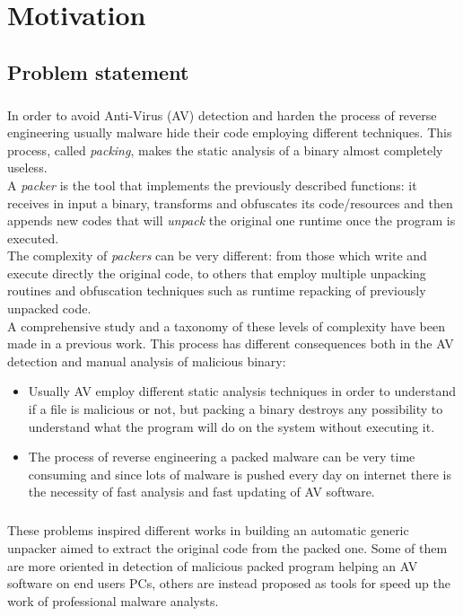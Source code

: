 \chapter{Motivation}
\label{chapter2}
\thispagestyle{empty}

\section{Problem statement}
\paragraph{}
In order to avoid Anti-Virus (AV) detection and harden the process of reverse engineering usually malware hide their code employing different techniques. This process, called \textit{packing}, makes the static analysis of a binary almost completely useless.\\
A \textit{packer} is the tool that implements the previously described functions: it receives in input a binary, transforms and obfuscates its code/resources and then appends new codes that will \textit{unpack} the original one runtime once the program is executed.\\
The complexity of \textit{packers} can be very different: from those which write and execute directly the original code, to others that employ multiple unpacking routines and obfuscation techniques such as runtime repacking of previously unpacked code.\\ A comprehensive study and a taxonomy of these levels of complexity have been made in a previous work. 
This process has different consequences both in the AV detection and manual analysis of malicious binary:
\begin{itemize}
\item Usually AV employ different static analysis techniques in order to understand if a file is malicious or not, but packing a binary destroys any possibility to understand what the program will do on the system without executing it.
\item The process of reverse engineering a packed malware can be very time consuming and since lots of malware is pushed every day on internet there is the necessity of fast analysis and fast updating of AV software.
\end{itemize}
\paragraph{}
These problems inspired different works in building an automatic generic unpacker aimed to extract the original code from the packed one. Some of them are more oriented in detection of malicious packed program helping an AV software on end users PCs, others are instead proposed as tools for speed up the work of professional malware analysts.

